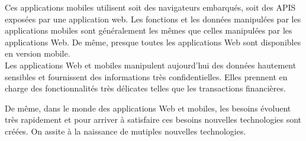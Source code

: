 Ces applications mobiles utilisent soit des navigateurs embarqués, soit des APIS exposées par une application web. Les fonctions et les données manipulées par les applications mobiles sont généralement les mêmes que celles manipulées par les applications Web. De même, presque toutes les applications Web sont disponibles en version mobile.\\
Les applications Web et mobiles manipulent aujourd'hui des données hautement sensibles et fournissent des informations très confidentielles. Elles prennent en charge des fonctionnalités très délicates telles que les transactions financières.
\begin{comment}
; il y a de cela quelques années, lorsqu’on voulait faire une transaction financière, il fallait aller à la banque et un agent le faisait pour vous alors qu’aujourd'hui, avec ces applications web, il est possible de faire ces transactions soit même en ligne en fournissant certaines informations. Ceci étant, si un attaquant arrivait à compromettre ce genre d’applications par exemple, il lui serait facile de faire des transactions frauduleuses et vider votre compte bancaire. Qu’un individu malintentionné arrive à compromettre ce genre d’applications représenterait de gros risques à la fois pour les propriétaires de ces applications dont le business repose essentiellement sur ces dernières mais aussi pour les utilisateurs qui auront fourni des informations très sensibles (mots de passe, numéros de carte de crédit entre autres). 
\end{comment}
De même, dans le monde des applications Web et mobiles, les besoins évoluent très rapidement et pour arriver à satisfaire ces besoins nouvelles technologies sont créées. On assite à la naissance de mutiples nouvelles technologies.
